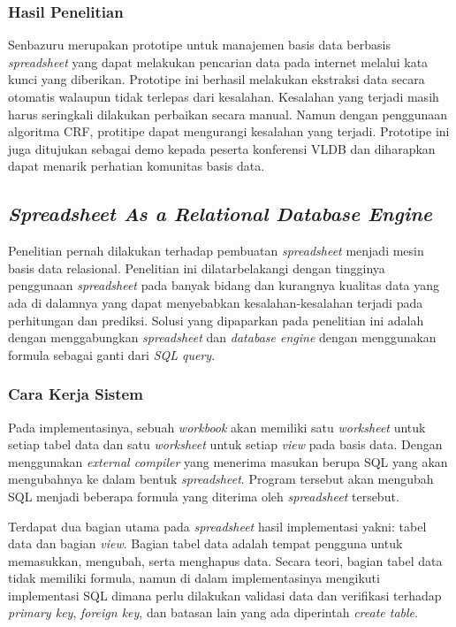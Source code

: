 \subsubsection{Hasil Penelitian}
Senbazuru merupakan prototipe untuk manajemen basis data berbasis \textit{spreadsheet} yang dapat melakukan pencarian data pada internet melalui kata kunci yang diberikan. Prototipe ini berhasil melakukan ekstraksi data secara otomatis walaupun tidak terlepas dari kesalahan. Kesalahan yang terjadi masih harus seringkali dilakukan perbaikan secara manual. Namun dengan penggunaan algoritma CRF, protitipe dapat mengurangi kesalahan yang terjadi. Prototipe ini juga ditujukan sebagai demo kepada peserta konferensi VLDB dan diharapkan dapat menarik perhatian komunitas basis data.

\subsection{\textit{Spreadsheet As a Relational Database Engine}}
Penelitian \citep{Tyszkiewicz2010} pernah dilakukan terhadap pembuatan \textit{spreadsheet} menjadi mesin basis data relasional. Penelitian ini dilatarbelakangi dengan tingginya penggunaan \textit{spreadsheet} pada banyak bidang dan kurangnya kualitas data yang ada di dalamnya yang dapat menyebabkan kesalahan-kesalahan terjadi pada perhitungan dan prediksi. Solusi yang dipaparkan pada penelitian ini adalah dengan menggabungkan \textit{spreadsheet} dan \textit{database engine} dengan menggunakan formula sebagai ganti dari \textit{SQL query}.

\subsubsection{Cara Kerja Sistem}

Pada implementasinya, sebuah \textit{workbook} akan memiliki satu \textit{worksheet} untuk setiap tabel data dan satu \textit{worksheet} untuk setiap \textit{view} pada basis data. Dengan menggunakan \textit{external compiler} yang menerima masukan berupa SQL yang akan mengubahnya ke dalam bentuk \textit{spreadsheet}. Program tersebut akan mengubah SQL menjadi beberapa formula yang diterima oleh \textit{spreadsheet} tersebut.

Terdapat dua bagian utama pada \textit{spreadsheet} hasil implementasi yakni: tabel data dan bagian \textit{view}. Bagian tabel data adalah tempat pengguna untuk memasukkan, mengubah, serta menghapus data. Secara teori, bagian tabel data tidak memiliki formula, namun di dalam implementasinya mengikuti implementasi SQL dimana perlu dilakukan validasi data dan verifikasi terhadap \textit{primary key}, \textit{foreign key}, dan batasan lain yang ada diperintah \textit{create table}.

